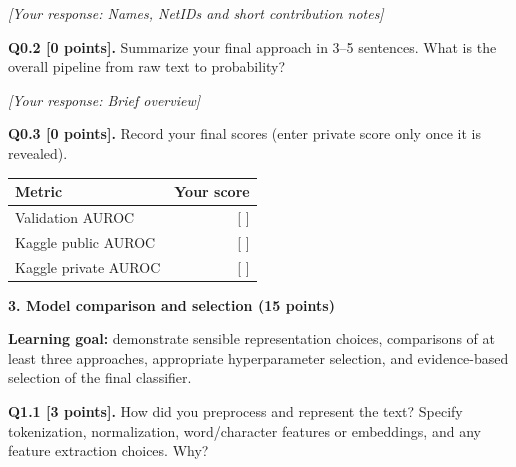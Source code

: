 \documentclass[11pt,letterpaper]{article}
\begin{document}
\textit{[Your response: Names, NetIDs and short contribution notes]}

\newpage

\textbf{Q0.2 [0 points].} Summarize your final approach in 3--5 sentences. What is the overall pipeline from raw text to probability?

\textit{[Your response: Brief overview]}

\vspace{14pt}
\textbf{Q0.3 [0 points].} Record your final scores (enter private score only once it is revealed).

\vspace{4pt}
\begin{tabularx}{0.65\textwidth}{@{}Xr@{}}
\toprule
\textbf{Metric} & \textbf{Your score} \\
\midrule
Validation AUROC & [ ] \\
Kaggle public AUROC & [ ] \\
Kaggle private AUROC & [ ] \\
\bottomrule
\end{tabularx}

\newpage

{\large\textbf{3. Model comparison and selection (15 points)}}
\vspace{2pt}

\textbf{Learning goal:} demonstrate sensible representation choices, comparisons of at least three approaches, appropriate hyperparameter selection, and evidence-based selection of the final classifier.

\vspace{6pt}
\textbf{Q1.1 [3 points].} How did you preprocess and represent the text? Specify tokenization, normalization, word/character features or embeddings, and any feature extraction choices. Why?
\end{document}
